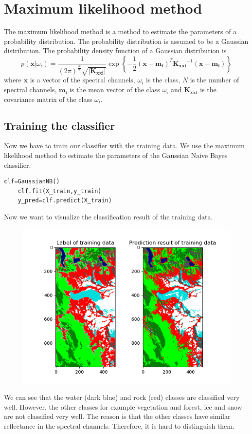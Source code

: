 \documentclass[12pt
,headinclude
,headsepline
,bibtotocnumbered
]{scrartcl}
\begin{document}
\section*{Maximum likelihood method}
The maximum likelihood method is a method to estimate the parameters of a probability distribution. The probability distribution is assumed to be a Gaussian distribution. The probability density function of a Gaussian distribution is
\begin{equation*}
    p(\boldsymbol{x}|\omega_i)=\frac{1}{(2\pi)^{\frac{N}{2}}\sqrt{|\boldsymbol{K_{xxi}}|}}\exp{\left\{-\frac{1}{2}(\boldsymbol{x}-\boldsymbol{m_i})^T\boldsymbol{K_{xxi}}^{-1}(\boldsymbol{x}-\boldsymbol{m_i})\right\}}
\end{equation*}
where $\boldsymbol{x}$ is a vector of the spectral channels, $\omega_i$ is the class, $N$ is the number of spectral channels, $\boldsymbol{m_i}$ is the mean vector of the class $\omega_i$ and $\boldsymbol{K_{xxi}}$ is the covariance matrix of the class $\omega_i$.
\subsection*{Training the classifier}
Now we have to train our classifier with the training data. We use the maximum likelihood method to estimate the parameters of the Gaussian Naive Bayes classifier.
\begin{lstlisting}[breaklines=true]
    clf=GaussianNB()
    clf.fit(X_train,y_train)
    y_pred=clf.predict(X_train)
\end{lstlisting}
Now we want to visualize the classification result of the training data.
\begin{figure}[H]
\centering
\includegraphics[width=1\textwidth]{plots/train_result.png}
\end{figure}
We can see that the water (dark blue) and rock (red) classes are classified very well. However, the other classes for example vegetation and forest, ice and snow are not classified very well. The reason is that the other classes have similar reflectance in the spectral channels. Therefore, it is hard to distinguish them.
\end{document}
